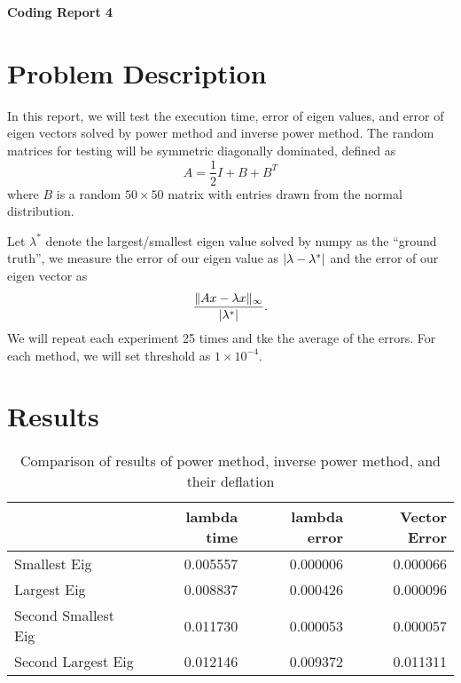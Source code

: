 \documentclass[a4paper,12pt]{article}
\begin{document}
\begin{center} %
	{\Large \bf Coding Report 4} %
	\vspace{2mm}
\end{center}  


\section{Problem Description}

In this report, we will test the execution time, error of eigen values, and error of eigen vectors
solved by power method and inverse power method.
The random matrices for testing will be symmetric diagonally dominated, defined as
$$
A = \frac{1}{2}I + B + B^{T}
$$
where $B$ is a random $50 \times 50$ matrix with entries drawn from the normal distribution.

Let $\lambda^*$ denote the largest/smallest eigen value solved by numpy as the ``ground truth'',
we measure the error of our eigen value as $\lvert\lambda - \lambda^*\rvert$
and the error of our eigen vector as
$$
\frac{\lVert Ax - \lambda x\rVert_{\infty}}{\lvert\lambda^*\rvert}.
$$
We will repeat each experiment 25 times and tke the average of the errors.
For each method, we will set threshold as $1 \times 10^{-4}$.

\section{Results}

\begin{table}[h]
\begin{center}
	\begin{tabular}{lrrr}
	\toprule
	{} &  lambda time &  lambda error &  Vector Error \\
	\midrule
	Smallest Eig        &     0.005557 &      0.000006 &      0.000066 \\
	Largest Eig         &     0.008837 &      0.000426 &      0.000096 \\
	Second Smallest Eig &     0.011730 &      0.000053 &      0.000057 \\
	Second Largest Eig  &     0.012146 &      0.009372 &      0.011311 \\
	\bottomrule
	\end{tabular}
	\caption{Comparison of results of power method, inverse power method, and their deflation}
\end{center}
\end{table}
\end{document}
